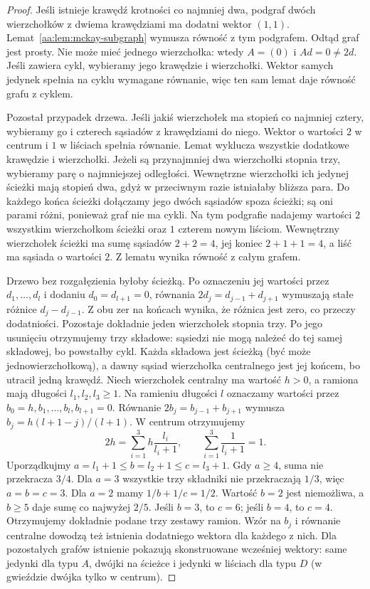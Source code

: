 \begin{proof}
Jeśli istnieje krawędź krotności co najmniej dwa,
podgraf dwóch wierzchołków z dwiema krawędziami
ma dodatni wektor $(1,1)$. Lemat~\ref{aa:lem:mckay-subgraph}
wymusza równość z tym podgrafem.
Odtąd graf jest prosty. Nie może mieć jednego
wierzchołka: wtedy $A=(0)$ i $Ad=0\ne2d$.
Jeśli zawiera cykl, wybieramy
jego krawędzie i wierzchołki. Wektor samych jedynek
spełnia na cyklu wymagane równanie, więc ten sam
lemat daje równość grafu z cyklem.

Pozostał przypadek drzewa. Jeśli jakiś wierzchołek ma
stopień co najmniej cztery, wybieramy go i czterech
sąsiadów z krawędziami do niego. Wektor o wartości
$2$ w centrum i $1$ w liściach spełnia równanie.
Lemat wyklucza wszystkie dodatkowe krawędzie i wierzchołki.
Jeżeli są przynajmniej dwa wierzchołki stopnia trzy,
wybieramy parę o najmniejszej odległości. Wewnętrzne
wierzchołki ich jedynej ścieżki mają stopień dwa,
gdyż w przeciwnym razie istniałaby bliższa para.
Do każdego końca ścieżki dołączamy jego dwóch sąsiadów
spoza ścieżki; są oni parami różni, ponieważ graf
nie ma cykli. Na tym podgrafie nadajemy wartości
$2$ wszystkim wierzchołkom ścieżki oraz $1$ czterem
nowym liściom. Wewnętrzny wierzchołek ścieżki ma
sumę sąsiadów $2+2=4$, jej koniec $2+1+1=4$,
a liść ma sąsiada o wartości $2$.
Z lematu wynika równość z całym grafem.

Drzewo bez rozgałęzienia byłoby ścieżką.
Po oznaczeniu jej wartości przez $d_1,\ldots,d_l$
i dodaniu $d_0=d_{l+1}=0$, równania
$2d_j=d_{j-1}+d_{j+1}$ wymuszają stałe różnice
$d_j-d_{j-1}$. Z obu zer na końcach wynika, że różnica
jest zero, co przeczy dodatniości.
Pozostaje dokładnie jeden wierzchołek stopnia trzy.
Po jego usunięciu otrzymujemy trzy składowe: sąsiedzi
nie mogą należeć do tej samej składowej, bo powstałby
cykl. Każda składowa jest ścieżką (być może
jednowierzchołkową), a dawny sąsiad wierzchołka
centralnego jest jej końcem, bo utracił jedną krawędź.
Niech wierzchołek centralny ma wartość $h>0$,
a ramiona mają długości $l_1,l_2,l_3\ge1$. Na ramieniu długości $l$ oznaczamy
wartości przez $b_0=h,b_1,\ldots,b_l,b_{l+1}=0$.
Równanie $2b_j=b_{j-1}+b_{j+1}$ wymusza
$b_j=h(l+1-j)/(l+1)$. W centrum otrzymujemy
\[
 2h=\sum_{i=1}^3 h\frac{l_i}{l_i+1},
 \qquad
 \sum_{i=1}^3\frac1{l_i+1}=1.
\]
Uporządkujmy $a=l_1+1\le b=l_2+1\le c=l_3+1$.
Gdy $a\ge4$, suma nie przekracza $3/4$.
Dla $a=3$ wszystkie trzy składniki nie przekraczają
$1/3$, więc $a=b=c=3$. Dla $a=2$ mamy
$1/b+1/c=1/2$. Wartość $b=2$ jest niemożliwa,
a $b\ge5$ daje sumę co najwyżej $2/5$.
Jeśli $b=3$, to $c=6$; jeśli $b=4$, to $c=4$.
Otrzymujemy dokładnie podane trzy zestawy ramion.
Wzór na $b_j$ i równanie centralne dowodzą też istnienia
dodatniego wektora dla każdego z nich. Dla pozostałych
grafów istnienie pokazują skonstruowane wcześniej
wektory: same jedynki dla typu $A$, dwójki na ścieżce
i jedynki w liściach dla typu $D$ (w gwieździe
dwójka tylko w centrum).


\end{proof}
